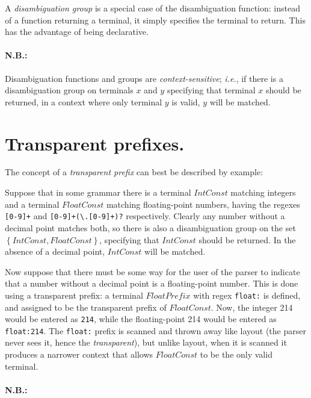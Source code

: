 \documentclass[12pt,english,twoside]{report}
\begin{document}
A \emph{disambiguation group} is a special case of the disambiguation
function: instead of a function returning a terminal, it simply specifies
the terminal to return. This has the advantage of being declarative.


\paragraph{N.B.:}

Disambiguation functions and groups are \emph{context-sensitive};
\emph{i.e.}, if there is a disambiguation group on terminals $x$
and $y$ specifying that terminal $x$ should be returned, in a context
where only terminal $y$ is valid, $y$ will be matched.


\section{Transparent prefixes.}

The concept of a \emph{transparent prefix} can best be described by
example:

Suppose that in some grammar there is a terminal $IntConst$ matching
integers and a terminal $FloatConst$ matching floating-point numbers,
having the regexes \texttt{{[}0-9]+} and
\texttt{{[}0-9]+(\textbackslash{}.{[}0-9]+)?} respectively. Clearly
any number without a decimal point matches both, so there is also a
disambiguation group on the set $\left\{ IntConst,FloatConst\right\}
$, specifying that $IntConst$ should be returned. In the absence
of a decimal point, $IntConst$ will be matched.

Now suppose that there must be some way for the user of the parser
to indicate that a number without a decimal point is a floating-point
number. This is done using a transparent prefix: a terminal $FloatPrefix$
with regex \texttt{float:} is defined, and assigned to be the transparent
prefix of $FloatConst$. Now, the integer 214 would be entered as
\texttt{214}, while the floating-point 214 would be entered as \texttt{float:214}.
The \texttt{float:} prefix is scanned and thrown away like layout
(the parser never sees it, hence the \emph{transparent}), but unlike
layout, when it is scanned it produces a narrower context that allows
$FloatConst$ to be the only valid terminal.


\paragraph{N.B.:}
\end{document}
